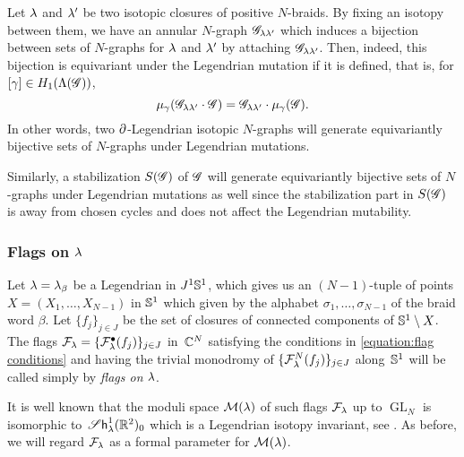 \begin{remark}\label{remark:boundary-Legendrian isotopy}
Let $\lambda$ and $\lambda'$ be two isotopic closures of positive $N$-braids.
By fixing an isotopy between them, we have an annular $N$-graph $\mathscr{G}_{\lambda \lambda'}$ which induces a bijection between sets of $N$-graphs for $\lambda$ and $\lambda'$ by attaching $\mathscr{G}_{\lambda\lambda'}$.
Then, indeed, this bijection is equivariant under the Legendrian mutation if it is defined,  that is, for $[\gamma] \in H_1(\Lambda(\mathscr{G}))$, 
\[
\mu_{\gamma}(\mathscr{G}_{\lambda \lambda'} \cdot \mathscr{G})
= \mathscr{G}_{\lambda \lambda'} \cdot \mu_{\gamma}(\mathscr{G}).
\]
In other words, two $\partial$-Legendrian isotopic $N$-graphs will generate equivariantly bijective sets of $N$-graphs under Legendrian mutations.
\end{remark}

\begin{remark}\label{remark:Stabilization}
Similarly, a stabilization $S(\mathscr{G})$ of $\mathscr{G}$ will generate equivariantly bijective sets of $N$-graphs under Legendrian mutations as well since the stabilization part in $S(\mathscr{G})$ is away from chosen cycles and does not affect the Legendrian mutability.
\end{remark}


\subsubsection{Flags on $\lambda$}
Let $\lambda=\lambda_\beta$ be a Legendrian in $J^1\mathbb{S}^1$, which gives us an $(N-1)$-tuple of points $X=(X_1,\dots, X_{N-1})$  in $\mathbb{S}^1$ which given by the alphabet $\sigma_1,\dots,\sigma_{N-1}$ of the braid word $\beta$.
Let $\{f_j\}_{j\in J}$ be the set of closures of connected components of $\mathbb{S}^1\setminus X$.
The flags $\mathcal{F}_\lambda=\{\mathcal{F}_\lambda^\bullet(f_j)\}_{j\in J}$ in~$\mathbb{C}^N$ satisfying  the conditions in \eqref{equation:flag conditions} and having the trivial monodromy of $\{\mathcal{F}^N_\lambda(f_j)\}_{j\in J}$ along~$\mathbb{S}^1$ will be called simply by \emph{flags on $\lambda$}.

It is well known that the moduli space $\mathcal{M}(\lambda)$ of such flags $\mathcal{F}_\lambda$ up to $\operatorname{GL}_N$ is isomorphic to~$\operatorname{\mathscr{S}\mathsf{h}}_\lambda^1(\mathbb{R}^2)_0$ which is a Legendrian isotopy invariant, see \cite[Theorem 1.1]{STZ2017}. 
As before, we will regard $\mathcal{F}_\lambda$ as a formal parameter for $\mathcal{M}(\lambda)$.

